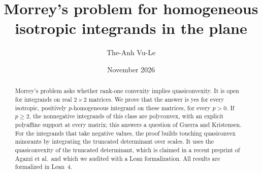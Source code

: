 \documentclass[11pt,reqno]{amsart}
\title[Homogeneous isotropic integrands in the plane]{Morrey's problem for homogeneous
isotropic integrands in the plane}
\author{The-Anh Vu-Le}
\date{November 2026}
\theoremstyle{plain}
\theoremstyle{definition}
\theoremstyle{remark}
\numberwithin{equation}{section}
\begin{document}
\begin{abstract}
  Morrey's problem asks whether rank-one convexity implies quasiconvexity. It is open for
  integrands on real $2\times2$ matrices. We prove that the answer is yes for every isotropic,
  positively $p$-homogeneous integrand on these matrices, for every $p>0$. If $p\ge2$, the
  nonnegative integrands of this class are polyconvex, with an explicit polyaffine support at
  every matrix; this answers a question of Guerra and Kristensen. For the integrands that take
  negative values, the proof builds touching quasiconvex minorants by integrating the truncated
  determinant over scales. It uses the
  quasiconvexity of the truncated determinant, which is claimed in a recent preprint of Agazzi
  et al.\ and which we audited with a Lean formalization. All results are formalized in Lean~4.
\end{abstract}

\maketitle

\setcounter{tocdepth}{1}
{\small\tableofcontents}









\appendix
{}











\end{document}

